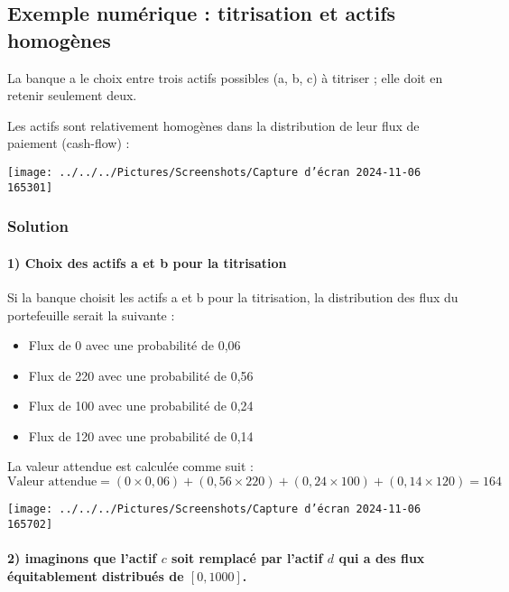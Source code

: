 \documentclass[a4paper, 12pt]{report}
\begin{document}
\subsection{Exemple numérique : titrisation et actifs homogènes}

La banque a le choix entre trois actifs possibles (a, b, c) à titriser ; elle doit en retenir seulement deux.

Les actifs sont relativement homogènes dans la distribution de leur flux de paiement (cash-flow) :
\begin{center}
	\texttt{[image: ../../../Pictures/Screenshots/Capture d'écran 2024-11-06 165301]}
\end{center}

\subsubsection{Solution}

\paragraph{1) Choix des actifs a et b pour la titrisation}

Si la banque choisit les actifs a et b pour la titrisation, la distribution des flux du portefeuille serait la suivante :

\begin{itemize}
	\item Flux de 0 avec une probabilité de 0,06
	\item Flux de 220 avec une probabilité de 0,56
	\item Flux de 100 avec une probabilité de 0,24
	\item Flux de 120 avec une probabilité de 0,14
\end{itemize}

La valeur attendue est calculée comme suit :
\[
\text{Valeur attendue}  = (0 \times 0,06) + (0,56 \times 220) + (0,24 \times 100) + (0,14 \times 120) = 164
\]

\begin{center}
	\texttt{[image: ../../../Pictures/Screenshots/Capture d'écran 2024-11-06 165702]}
\end{center}


\paragraph{2) imaginons que l’actif \( c \) soit remplacé par l’actif \( d \) qui a des flux équitablement distribués de \([0, 1000]\).} 
\end{document}

